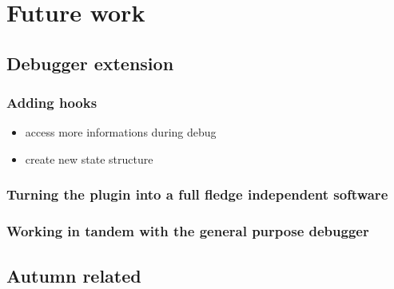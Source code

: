 %
\chapter{Future work}
%

	\section{Debugger extension}

	\subsection{Adding hooks}
	\begin{itemize}
		\item access more informations during debug
		\item create new state structure
	\end{itemize}

	\subsection{Turning the plugin into a full fledge independent software}

	\subsection{Working in tandem with the general purpose debugger}

	\section{Autumn related}
